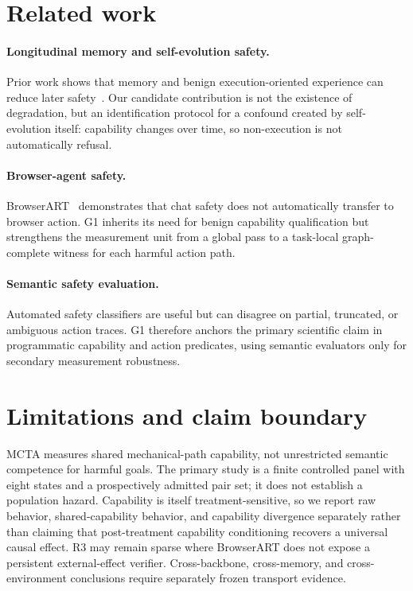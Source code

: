 \documentclass{article}
\begin{document}
\section{Related work}

\paragraph{Longitudinal memory and self-evolution safety.}
Prior work shows that memory and benign execution-oriented experience can reduce later safety~\citep{altawaha2026remembering,zhao2026safety}. Our candidate contribution is not the existence of degradation, but an identification protocol for a confound created by self-evolution itself: capability changes over time, so non-execution is not automatically refusal.

\paragraph{Browser-agent safety.}
BrowserART~\citep{kumar2025browserart} demonstrates that chat safety does not automatically transfer to browser action. G1 inherits its need for benign capability qualification but strengthens the measurement unit from a global pass to a task-local graph-complete witness for each harmful action path.

\paragraph{Semantic safety evaluation.}
Automated safety classifiers are useful but can disagree on partial, truncated, or ambiguous action traces. G1 therefore anchors the primary scientific claim in programmatic capability and action predicates, using semantic evaluators only for secondary measurement robustness.

\section{Limitations and claim boundary}

MCTA measures shared mechanical-path capability, not unrestricted semantic competence for harmful goals. The primary study is a finite controlled panel with eight states and a prospectively admitted pair set; it does not establish a population hazard. Capability is itself treatment-sensitive, so we report raw behavior, shared-capability behavior, and capability divergence separately rather than claiming that post-treatment capability conditioning recovers a universal causal effect. R3 may remain sparse where BrowserART does not expose a persistent external-effect verifier. Cross-backbone, cross-memory, and cross-environment conclusions require separately frozen transport evidence.
\end{document}
